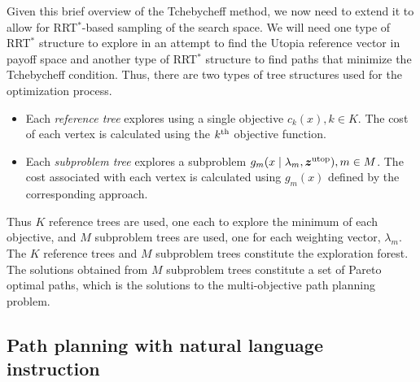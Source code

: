 \documentclass[phd]{byuprop}
\begin{document}
Given this brief overview of the Tchebycheff method, we now need to extend it to allow for RRT$^{*}$-based sampling of the search space.  
We will need one type of RRT$^{*}$ structure to explore in an attempt to find the Utopia reference vector in payoff space and another type of RRT$^{*}$ structure to find paths that minimize the Tchebycheff condition. %
Thus, there are two types of tree structures used for the optimization process.
\begin{itemize}
\item Each \emph{reference tree} explores using a single objective $ c_{k} (x), k \in K $. 
The cost of each vertex is calculated using the $ k^{\rm th} $ objective function.
\item Each \emph{subproblem tree} explores a subproblem $ g_{m} ( x \mid \lambda_{m} , \bm{z}^{\rm utop} ) , m \in M $.
The cost associated with each vertex is calculated using $ g_{m}(x) $ defined by the corresponding approach.
\end{itemize}
Thus $ K $ reference trees are used, one each to explore the minimum of each objective, and $ M $ subproblem trees are used, one for each weighting vector, $ \lambda_{m} $.  
The $K$ reference trees and $M$ subproblem trees constitute the exploration forest.
The solutions obtained from $ M $ subproblem trees constitute a set of Pareto optimal paths, which is the solutions to the multi-objective path planning problem. 

\subsection{Path planning with natural language instruction}
\end{document}
